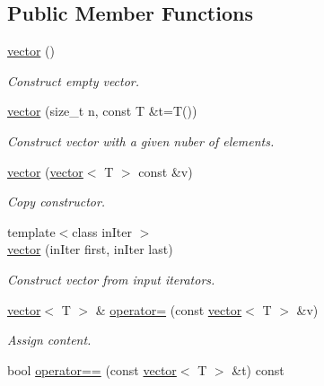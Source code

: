 \subsection*{Public Member Functions}
\begin{DoxyCompactItemize}
\item 
\hypertarget{classmerlin_1_1vector_ac48f70c583d3781dde90008b91a1b7a8}{}\hyperlink{classmerlin_1_1vector_ac48f70c583d3781dde90008b91a1b7a8}{vector} ()\label{classmerlin_1_1vector_ac48f70c583d3781dde90008b91a1b7a8}

\begin{DoxyCompactList}\small\item\em Construct empty vector. \end{DoxyCompactList}\item 
\hypertarget{classmerlin_1_1vector_a0e384bcf03c3f2886dedf1b24fc61057}{}\hyperlink{classmerlin_1_1vector_a0e384bcf03c3f2886dedf1b24fc61057}{vector} (size\+\_\+t n, const T \&t=T())\label{classmerlin_1_1vector_a0e384bcf03c3f2886dedf1b24fc61057}

\begin{DoxyCompactList}\small\item\em Construct vector with a given nuber of elements. \end{DoxyCompactList}\item 
\hyperlink{classmerlin_1_1vector_aebdbc7cbb94b53343d7a0b5059ea2e0f}{vector} (\hyperlink{classmerlin_1_1vector}{vector}$<$ T $>$ const \&v)
\begin{DoxyCompactList}\small\item\em Copy constructor. \end{DoxyCompactList}\item 
\hypertarget{classmerlin_1_1vector_a7af3ec7e6c6a760d277ed21479ee7500}{}{\footnotesize template$<$class in\+Iter $>$ }\\\hyperlink{classmerlin_1_1vector_a7af3ec7e6c6a760d277ed21479ee7500}{vector} (in\+Iter first, in\+Iter last)\label{classmerlin_1_1vector_a7af3ec7e6c6a760d277ed21479ee7500}

\begin{DoxyCompactList}\small\item\em Construct vector from input iterators. \end{DoxyCompactList}\item 
\hyperlink{classmerlin_1_1vector}{vector}$<$ T $>$ \& \hyperlink{classmerlin_1_1vector_a0f114ae4ee7406d5ba5d48b326fc3173}{operator=} (const \hyperlink{classmerlin_1_1vector}{vector}$<$ T $>$ \&v)
\begin{DoxyCompactList}\small\item\em Assign content. \end{DoxyCompactList}\item 
\hypertarget{classmerlin_1_1vector_a8def264e9a1d31a332ceb587f58f0306}{}bool \hyperlink{classmerlin_1_1vector_a8def264e9a1d31a332ceb587f58f0306}{operator==} (const \hyperlink{classmerlin_1_1vector}{vector}$<$ T $>$ \&t) const \label{classmerlin_1_1vector_a8def264e9a1d31a332ceb587f58f0306}


\end{DoxyCompactItemize}
